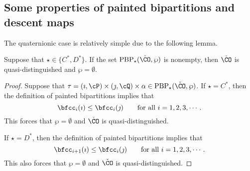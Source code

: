 \documentclass[ssunip]{subfiles}
\begin{document}
\subsection{Some properties of painted bipartitions and descent maps}

The quaternionic case is relatively simple due to the following lemma. 
\begin{prop}
  Suppose that $\star\in \{C^*, D^*\}$. If the set $\mathrm{PBP}_\star(\check \CO,\wp)$ is nonempty, then $\check \CO$ is quasi-distinguished  and $\wp=\emptyset$.  
\end{prop}
\begin{proof}
  Suppose that $\tau=(\imath,\cP)\times(\jmath,\cQ)\times \alpha \in  \mathrm{PBP}_\star(\check \CO,\wp)$. If  $\star=C^*$, then  the definition of painted bipartitions implies that 
 \[
 \bfcc_i(\imath)\leq \bfcc_i(\jmath) \qquad \textrm{for all } i=1,2,3, \cdots.
 \]
This forces that  $\wp=\emptyset$ and  $\check \CO$ is quasi-distinguished. 
 
 If  $\star=D^*$, then  the definition of painted bipartitions implies that 
 \[
 \bfcc_{i+1}(\imath)\leq \bfcc_i(\jmath) \qquad \textrm{for all } i=1,2,3, \cdots.
 \]
This  also forces that  $\wp=\emptyset$ and  $\check \CO$ is quasi-distinguished.
 
\end{proof}







\end{document}
